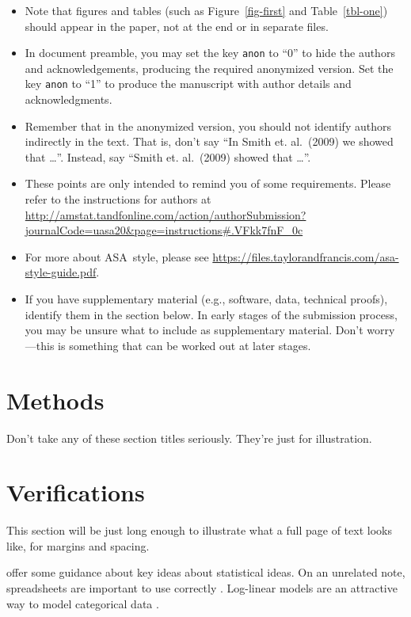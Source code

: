 \documentclass[
  12pt]{article}
\providecommand{\tightlist}{%
  \setlength{\itemsep}{0pt}\setlength{\parskip}{0pt}}\usepackage{longtable,booktabs,array}
\begin{document}
\begin{itemize}
\tightlist
\item
  Note that figures and tables (such as Figure~\ref{fig-first} and
  Table~\ref{tbl-one}) should appear in the paper, not at the end or in
  separate files.
\item
  In document preamble, you may set the key \texttt{anon} to ``0'' to hide the authors and acknowledgements,
  producing the required anonymized version. Set the key \texttt{anon} to ``1'' to produce the manuscript with author details and acknowledgments. 
\item
  Remember that in the anonymized version, you should not identify
  authors indirectly in the text. That is, don't say ``In Smith et.
  al.~(2009) we showed that \ldots{}''. Instead, say ``Smith et.
  al.~(2009) showed that \ldots{}''.
\item
  These points are only intended to remind you of some requirements.
  Please refer to the instructions for authors at
  \url{http://amstat.tandfonline.com/action/authorSubmission?journalCode=uasa20&page=instructions\#.VFkk7fnF_0c}
\item
  For more about ASA~style, please see
  \url{https://files.taylorandfrancis.com/asa-style-guide.pdf}.
\item
  If you have supplementary material (e.g., software, data, technical
  proofs), identify them in the section below. In early stages of the
  submission process, you may be unsure what to include as supplementary
  material. Don't worry---this is something that can be worked out at
  later stages.
\end{itemize}

\section{Methods}\label{sec-meth}

Don't take any of these section titles seriously. They're just for
illustration.

\section{Verifications}\label{sec-verify}

This section will be just long enough to illustrate what a full page of
text looks like, for margins and spacing.

\addtolength{\textheight}{.5in}%

\citet{gelm:veht:2021} offer some guidance about key ideas about
statistical ideas. On an unrelated note, spreadsheets are important to
use correctly \citep{brom:woo:2018}. Log-linear models are an attractive
way to model categorical data \citep{bish:fien:1975}.
\end{document}
